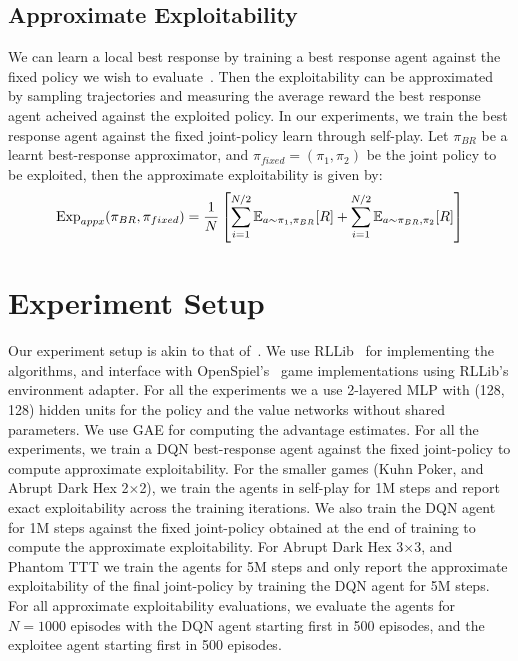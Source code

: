 \subsection{Approximate Exploitability}
We can learn a local best response by training a best response agent against the fixed policy we
wish to evaluate~\cite{timbersApproximate2022}.
Then the exploitability can be approximated by sampling trajectories and measuring the average
reward the best response agent acheived against the exploited policy.
In our experiments, we train the best response agent against the fixed joint-policy learn through
self-play.
Let $\pi_{BR}$ be a learnt best-response approximator, and $\pi_{fixed}=(\pi_1, \pi_2)$ be the
joint policy to be exploited, then the approximate exploitability is given by:
\begin{equation}
	\label{eqn:appxexp} \text{Exp}_{appx} (\pi_{BR}, \pi_{fixed}) = \frac{1}{N} \left[ \sum_{i=1}^{N/2}
		\mathbb{E}_{a \sim \pi_1, \pi_{BR}} [R] + \sum_{i=1}^{N/2} \mathbb{E}_{a \sim \pi_{BR}, \pi_2} [R] \right]
\end{equation} 

\section{Experiment Setup}
Our experiment setup is akin to that of~\cite{sokotaUnified2023}.
We use RLLib~\cite{liangRLlib2018} for implementing the algorithms, and interface with
OpenSpiel's~\cite{lanctotOpenSpiel2020} game implementations using RLLib's environment adapter.
For all the experiments we a use 2-layered MLP with (128, 128) hidden units for the policy and the
value networks without shared parameters.
We use GAE for computing the advantage estimates.
For all the experiments, we train a DQN best-response agent against the fixed joint-policy to
compute approximate exploitability.
For the smaller games (Kuhn Poker, and Abrupt Dark Hex 2$\times$2), we train the agents in
self-play for 1M steps and report exact exploitability across the training iterations.
We also train the DQN agent for 1M steps against the fixed joint-policy obtained at the end of
training to compute the approximate exploitability.
For Abrupt Dark Hex 3$\times$3, and Phantom TTT we train the agents for 5M steps and only report
the approximate exploitability of the final joint-policy by training the DQN agent for 5M steps.
For all approximate exploitability evaluations, we evaluate the agents for $N=1000$ episodes with
the DQN agent starting first in 500 episodes, and the exploitee agent starting first in 500
episodes.

